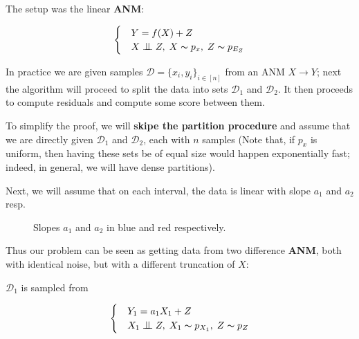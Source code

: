 The setup was the linear \textbf{ANM}:

\[ \begin{cases} 
    & Y = f(X) + Z  \\
    & X \bigCI Z,\; X \thicksim p_x,\; Z \thicksim p_{E_Z}  
 \end{cases}
\]

In practice we are given samples $\mathcal{D} = \{x_i, y_i\}_{i \in [n]}$ from an ANM $X \rightarrow Y$; next 
the algorithm will proceed to split the data into sets $\mathcal{D}_1$ and $\mathcal{D}_2$. It then proceeds 
to compute residuals and compute some score between them.

To simplify the proof, we will \textbf{skipe the partition procedure} and assume that
we are directly given $\mathcal{D}_1$ and $\mathcal{D}_2$, each with 
$n$ samples (Note that, if $p_x$ is uniform, then having these sets be of equal size would happen exponentially 
fast; indeed, in general, we will have dense partitions). 

Next, we will assume that on each interval, the data is linear with slope $a_1$ and $a_2$ resp. 

\begin{figure}[!h]
    \centering
      \caption{Slopes $a_1$ and $a_2$ in blue and red respectively.}
\end{figure}

Thus our problem can be seen as getting data from two difference \textbf{ANM}, both with identical noise, but with 
a different truncation of $X$:

$\mathcal{D}_1$ is sampled from 

\[ \begin{cases} 
    & Y_1 = a_1 X_1 + Z  \\
    & X_1 \bigCI Z,\; X_1 \thicksim p_{X_1},\; Z \thicksim p_{Z}  
 \end{cases}
\]

